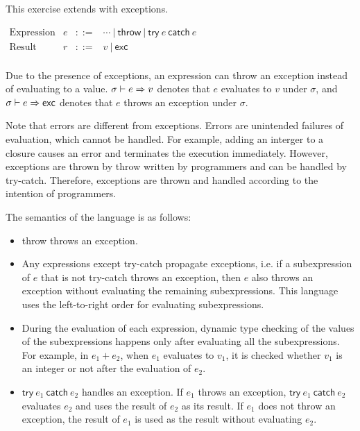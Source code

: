 \begin{exercise}

This exercise extends \Lang with exceptions.

$
  \begin{array}{lrrl}
    \text{Expression} & e & ::= & \cdots\ |\ \textsf{throw}\ |\ \textsf{try}\ e\ \textsf{catch}\ e \\
    \text{Result} & r & ::= & v\ |\ \textsf{exc} \\
  \end{array}
$

Due to the presence of exceptions, an expression can throw an exception
instead of evaluating to a value. $\sigma\vdash e\Rightarrow v$ denotes that $e$
evaluates to $v$ under $\sigma$, and $\sigma\vdash e\Rightarrow\textsf{exc}$ denotes that $e$
throws an exception under $\sigma$.

Note that errors are
different from exceptions. Errors are unintended failures of evaluation, which
cannot be handled. For example, adding an interger to a closure causes an error
and terminates the execution immediately.
However, exceptions are thrown by \textsf{throw} written by programmers and
can be handled by \textsf{try-catch}. Therefore, exceptions are thrown and handled
according to the intention of programmers.

The semantics of the language is as follows:

\begin{itemize}
  \item \textsf{throw} throws an exception.
  \item Any expressions except \textsf{try-catch} propagate exceptions, i.e. if a
    subexpression of $e$ that is not \textsf{try-catch} throws an exception, then
    $e$ also throws an exception without evaluating the remaining subexpressions.
    This language uses the left-to-right order for evaluating subexpressions.
  \item During the evaluation of each expression,
    dynamic type checking of the values of the subexpressions happens only after
    evaluating all the subexpressions. For example, in $e_1+e_2$, when $e_1$
    evaluates to $v_1$, it is checked whether $v_1$ is an integer or not after
    the evaluation of $e_2$.
  \item $\textsf{try}\ e_1\ \textsf{catch}\ e_2$ handles an exception. If $e_1$ throws
    an exception, $\textsf{try}\ e_1\ \textsf{catch}\ e_2$ evaluates $e_2$ and uses the
    result of $e_2$ as its result. If $e_1$ does not throw an exception, the
    result of $e_1$ is used as the result without evaluating $e_2$.
\end{itemize}


\end{exercise}
